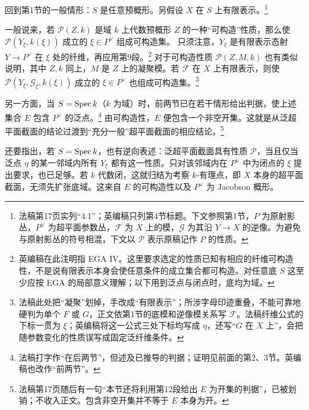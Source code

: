\begingroup
\def\OO{\mathcal O}\def\FF{\mathcal F}\def\GG{\mathcal G}
\def\PP{\mathbf P}\def\calP{\mathcal P}\def\dd{\delta}
\def\Div{\operatorname{Div}}\def\depth{\operatorname{depth}}
\def\pr{\operatorname{pr}}\def\coker{\operatorname{coker}}
回到第1节的一般情形：$S$ 是任意预概形。另假设 $X$ 在 $S$ 上有限表示。\footnote{法稿第17页实列“4.1”；英编稿只列第4节标题。下文参照第1节，$P$ 为原射影丛，$P^\vee$ 为超平面参数丛，$\FF$ 为 $X$ 上的模，$\GG$ 为其沿 $Y\to X$ 的逆像。为避免与原射影丛的符号相混，下文以 $\calP$ 表示原稿记作 $P$ 的性质。}

一般说来，若 $\calP(Z,k)$ 是域 $k$ 上代数预概形 $Z$ 的一种“可构造”性质，那么使
$\calP(Y_\xi,k(\xi))$ 成立的 $\xi\in P^\vee$ 组成可构造集。
只须注意，$Y_\xi$ 是有限表示态射 $Y\to P^\vee$ 在 $\xi$ 处的纤维，再应用第9段。\footnote{英编稿在此注明指 EGA IV。这里要求选定的性质已知有相应的纤维可构造性，不是说有限表示本身会使任意条件的成立集合都可构造。对任意底 $S$ 这至少应按 EGA 的局部意义理解；以下用到泛点与闭点时，底均为域。}
对于可构造性质 $\calP(Z,M,k)$ 也有类似说明，其中 $Z,k$ 同上，$M$ 是 $Z$ 上的凝聚模。若 $\FF$ 在 $X$ 上有限表示，则使
$\calP(Y_\xi,\GG_\xi,k(\xi))$ 成立的 $\xi\in P^\vee$ 也组成可构造集。\footnote{法稿此处把“凝聚”划掉，手改成“有限表示”；所涉字母印迹重叠，不能可靠地硬判为单个 $F$ 或 $G$，正文依第1节的底模和逆像模关系写 $\FF$。法稿纤维公式的下标一贯为 $\xi$；英编稿将这一公式三处下标均写成 $\eta$，还写“$G$ 在 $X$ 上”，会把随参数变化的性质误写成固定泛纤维条件。}

另一方面，当 $S=\operatorname{Spec} k$（$k$ 为域）时，前两节已在若干情形给出判据，使上述集合 $E$ 包含 $P^\vee$ 的泛点。\footnote{法稿打字作“在后两节”，但述及已推导的判据；证明见前面的第2、3节。英编稿也改作“前两节”。}
由可构造性，$E$ 便包含一个非空开集。这就是从泛超平面截面的结论过渡到“充分一般”超平面截面的相应结论。\footnote{法稿第17页随后有一句“本节还将利用第12段给出 $E$ 为开集的判据”，已被划销；不收入正文。包含非空开集并不等于 $E$ 本身为开。}

还要指出，若 $S=\operatorname{Spec} k$，也有逆向表述：泛超平面截面具有性质 $\calP$，当且仅当泛点 $\eta$ 的某一邻域内所有 $Y_\xi$ 都有这一性质。只对该邻域内在 $P^\vee$ 中为闭点的 $\xi$ 提出要求，也已足够。若 $k$ 代数闭，这就归结为考察 $k$-有理点，即 $X$ 本身的超平面截面，无须先扩张底域。这来自 $E$ 的可构造性以及 $P^\vee$ 为 Jacobson 概形。

